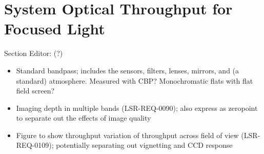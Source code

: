 \section{System Optical Throughput for Focused Light}
\label{sec:throughput}

Section Editor: (?)

\begin{itemize}
    \item Standard bandpass; includes the sensors, filters, lenses, mirrors, and (a standard) atmosphere. Measured with CBP? Monochromatic flats with flat field screen?
    \item Imaging depth in multiple bands (LSR-REQ-0090); also express as zeropoint to separate out the effects of image quality
    \item Figure to show throughput variation of throughput across field of view (LSR-REQ-0109); potentially separating out vignetting and CCD response
\end{itemize}